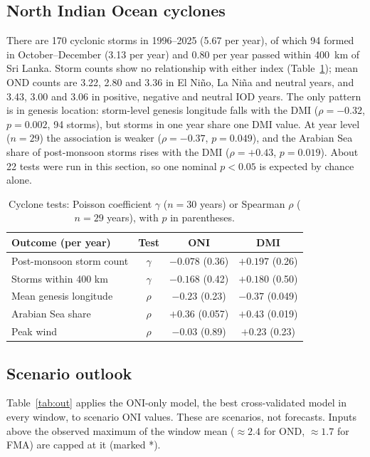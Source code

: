 \documentclass{article}
\begin{document}
\subsection{North Indian Ocean cyclones}
There are 170 cyclonic storms in 1996--2025 (5.67 per year), of which 94 formed in October--December
(3.13 per year) and 0.80 per year passed within 400~km of Sri Lanka. Storm counts show no
relationship with either index (Table~\ref{tab:cyc}); mean OND counts are 3.22, 2.80 and 3.36 in
El Ni\~{n}o, La Ni\~{n}a and neutral years, and 3.43, 3.00 and 3.06 in positive, negative and neutral
IOD years. The only pattern is in genesis location: storm-level genesis longitude falls with the DMI
($\rho=-0.32$, $p=0.002$, 94 storms), but storms in one year share one DMI value. At year level
($n=29$) the association is weaker ($\rho=-0.37$, $p=0.049$), and the Arabian Sea share of
post-monsoon storms rises with the DMI ($\rho=+0.43$, $p=0.019$). About 22 tests were run in
this section, so one nominal $p<0.05$ is expected by chance alone.

\begin{table}[t]
\centering
\footnotesize
\setlength{\tabcolsep}{3pt}
\caption{Cyclone tests: Poisson coefficient $\gamma$ ($n=30$ years) or Spearman $\rho$ ($n=29$
years), with $p$ in parentheses.}
\label{tab:cyc}
\begin{tabular}{lccc}
\toprule
Outcome (per year) & Test & ONI & DMI \\
\midrule
Post-monsoon storm count & $\gamma$ & $-0.078$ (0.36) & $+0.197$ (0.26) \\
Storms within 400 km & $\gamma$ & $-0.168$ (0.42) & $+0.180$ (0.50) \\
Mean genesis longitude & $\rho$ & $-0.23$ (0.23) & $-0.37$ (0.049) \\
Arabian Sea share & $\rho$ & $+0.36$ (0.057) & $+0.43$ (0.019) \\
Peak wind & $\rho$ & $-0.03$ (0.89) & $+0.23$ (0.23) \\
\bottomrule
\end{tabular}
\end{table}

\subsection{Scenario outlook}
Table~\ref{tab:out} applies the ONI-only model, the best cross-validated model in every window, to
scenario ONI values. These are scenarios, not forecasts. Inputs above the observed maximum of the
window mean ($\approx2.4$ for OND, $\approx1.7$ for FMA) are capped at it (marked *).
\end{document}
